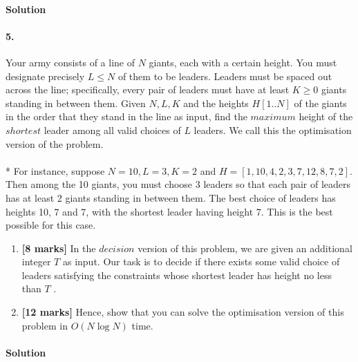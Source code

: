 \documentclass[a4paper]{scrartcl}
\begin{document}
\paragraph{Solution}



\paragraph{5.}
\label{sec:Question 5}
Your army consists of a line of $N$ giants, each with a certain height. You must designate precisely $L \leq N$ of them to be leaders. Leaders must be spaced out across the line; specifically, every pair of leaders must have at least $K \geq 0$ giants standing in between them. Given $N,L,K$ and the heights $H[1..N]$ of the giants in the order that they stand in the line as input, find the $maximum$ height of the $shortest$ leader among all valid choices of $L$ leaders. We call this the optimisation version of the problem.\\
\\*
For instance, suppose $N = 10,L = 3,K = 2$ and $H = [1,10,4,2,3,7,12,8,7,2].$ Then among the 10 giants, you must choose 3 leaders so that each pair of leaders has at least 2 giants standing in between them. The best choice of leaders has heights 10, 7 and 7, with the shortest leader having height 7. This is the best possible for this case.
\begin{enumerate}[label=(\alph*)]
  \item {\bfseries[8 marks]} In the $decision$ version of this problem, we are given an additional integer $T$ as input. Our task is to decide if there exists some valid choice of leaders satisfying the constraints whose shortest leader has height no less than $T$ .
  \item {\bfseries[12 marks]} Hence, show that you can solve the optimisation version of this problem in $O(N\log{N})$ time.
\end{enumerate}
\paragraph{Solution}
\end{document}

